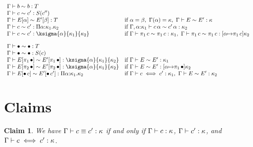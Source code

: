 \documentclass[twoside]{article}
\begin{document}
\[\begin{array}{ll}
\weakconequiv{\context}{\basetype}{\basetype}{\ktype}\\
\weakconequiv{\context}{\constructor}{\constructor'}{\ksingleton{\constructor''}}\\
\weakconequiv{\context}{E[\alpha]}{E'[\beta]}{\ktype}&
  \mbox{if}\ \alpha = \beta,\ \context(\alpha) = \kind,\
  \weakconequiv{\context}{E}{E'}{\kind}\\
\weakconequiv{\context}{\constructor}{\constructor'}
  {\kpi{\cvar}{\kind_1}{\kind_2}}&
  \mbox{if}\ \weakconequiv{\context,\cvar{:}\kind_1}
  {\capply{\constructor}{\cvar}}{\capply{\constructor'}{\cvar}}
  {\kind_2}\\
\weakconequiv{\context}{\constructor}{\constructor'}
  {\ksigma{\cvar}{\kind_1}{\kind_2}}&
  \mbox{if}\ 
  \weakconequiv{\context}{\cpi{1}{\constructor}}{\cpi{1}{\constructor}}
   {\kind_1},\
  \weakconequiv{\context}{\cpi{1}{\constructor}}{\cpi{1}{\constructor}}
     {\substitute{\cvar}{\cpi{1}{\constructor}}{\kind_2}}\\[10pt]

\weakconequiv{\context}{\hole}{\hole}{\ktype}\\
\weakconequiv{\context}{\hole}{\hole}{\ksingleton{\constructor}}\\
\weakconequiv{\context}{E[\cpi{1}{\hole}]}{E'[\cpi{1}{\hole}]}
   {\ksigma{\cvar}{\kind_1}{\kind_2}}&
   \mbox{if}\ 
   \weakconequiv{\context}{E}{E'}{\kind_1}\\
\weakconequiv{\context}{E[\cpi{2}{\hole}]}{E'[\cpi{2}{\hole}]}
   {\ksigma{\cvar}{\kind_1}{\kind_2}}&
   \mbox{if}\ 
   \weakconequiv{\context}{E}{E'}{\substitute{\cvar}{\cpi{1}{\hole}}\kind_2}\\
\weakconequiv{\context}{E[\capply{\hole}{\constructor}]}
   {E'[\capply{\hole}{\constructor'}]}{\kpi{\cvar}{\kind_1}{\kind_2}}&
   \mbox{if}\
   \conequiv{\context}{\constructor}{\constructor'}{\kind_1},\
   \weakconequiv{\context}{E}{E'}{\kind_2}\\
\end{array}
\]

\section{Claims}

\newtheorem{claim}{Claim}

\begin{claim}
We have $\Gamma\vdash c \equiv c' : \kappa$ if
and only if $\Gamma\vdash c : \kappa$, 
$\Gamma\vdash c' : \kappa$, and 
$\Gamma\vdash c \iff c' : \kappa$.
\end{claim}

%
%
\end{document}
